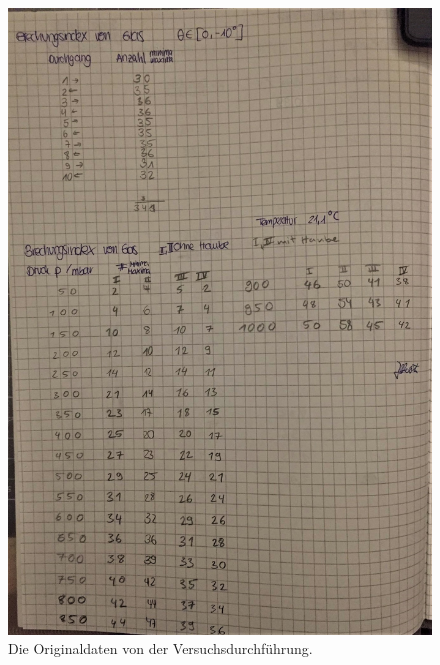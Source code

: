 \begin{figure}
    \centering
    \includegraphics[width=\textwidth]{bilder/Messwerte_Anhang2.jpeg}
    \caption{Die Originaldaten von der Versuchsdurchführung.}
    \label{fig:originaldaten2}
\end{figure}
